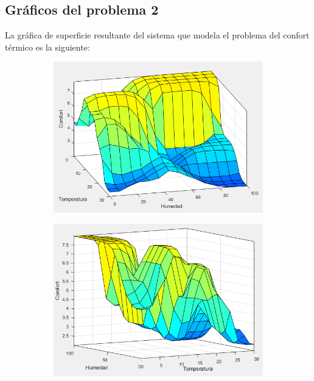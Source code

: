 \documentclass[11pt, letterpaper]{article}
\begin{document}
\newpage

\subsection{Gráficos del problema 2}

La gráfica de superficie resultante del sistema que modela el problema del confort térmico es la siguiente:

\begin{figure}[h]
	\centering
	\begin{subfigure}{0.42\textwidth} %
		\centering
		\includegraphics[width=1.3\textwidth]{IMG/P24.png}
		\label{fig:G10}
	\end{subfigure}
	\hfill
	
	\begin{subfigure}{0.42\textwidth} %
		\centering
		\includegraphics[width=1.2\textwidth]{IMG/P25.png}
		\label{fig:G11}
	\end{subfigure}
	\label{fig:comparacion5}
\end{figure}
\end{document}
